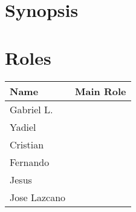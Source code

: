 \documentclass{article}
\begin{document}
\section{Synopsis}
\section{Roles}
\begin{center}

\begin{tabular}{| l | p{5cm} |}\hline
Name & Main Role \\ \hline
Gabriel L. & \\ \hline
Yadiel     & \\ \hline
Cristian   & \\ \hline
Fernando   & \\ \hline
Jesus	   & \\ \hline
Jose Lazcano  & \\ \hline
\end{tabular}

\end{center}
\end{document}

